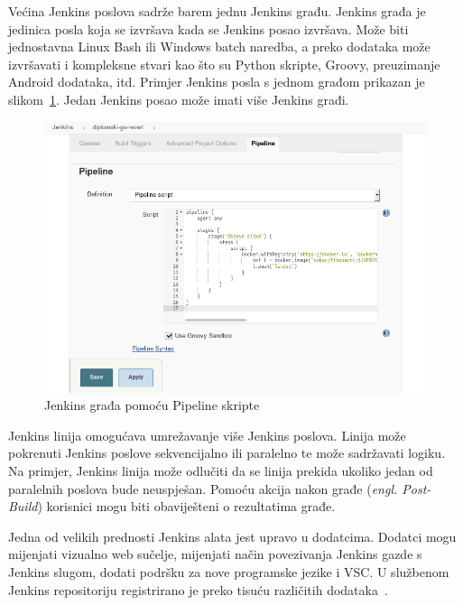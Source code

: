 Većina Jenkins poslova sadrže barem jednu Jenkins građu. Jenkins građa je jedinica posla koja se
izvršava kada se Jenkins posao izvršava. Može biti jednostavna Linux Bash ili Windows batch naredba,
a preko dodataka može izvršavati i kompleksne stvari kao što su Python skripte, Groovy, preuzimanje
Android dodataka, itd. Primjer Jenkins posla s jednom građom prikazan je
slikom~\ref{fig:02jenkins_pipeline}.  Jedan Jenkins posao može imati više Jenkins građi.

\begin{figure}[h]
    \centering
    \includegraphics[width=\textwidth]{img/02/jenkins_pipeline.png}
    \caption{Jenkins građa pomoću Pipeline skripte}%
    \label{fig:02jenkins_pipeline}
\end{figure}

Jenkins linija omogućava umrežavanje više Jenkins poslova. Linija može pokrenuti Jenkins poslove
sekvencijalno ili paralelno te može sadržavati logiku. Na primjer, Jenkins linija može odlučiti da
se linija prekida ukoliko jedan od paralelnih poslova bude neuspješan. Pomoću akcija nakon građe
(\textit{engl. Post-Build}) korisnici mogu biti obaviješteni o rezultatima građe.

Jedna od velikih prednosti Jenkins alata jest upravo u dodatcima. Dodatci mogu mijenjati vizualno
web sučelje, mijenjati način povezivanja Jenkins gazde s Jenkins slugom, dodati podršku za nove
programske jezike i VSC. U službenom Jenkins repositoriju registrirano je preko tisuću različitih
dodataka~\citep{JenkisPlugins}.

